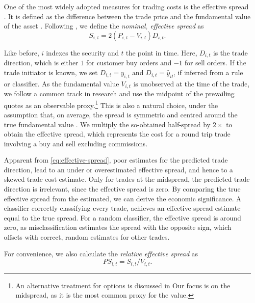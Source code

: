 One of the most widely adopted measures for trading costs is the effective spread \autocite[][112]{Piwowar_2006}. It is defined as the difference between the trade price and the fundamental value of the asset \autocite[][238--239]{bessembinderIssuesAssessingTrade2003}. Following \textcite[][238--239]{bessembinderIssuesAssessingTrade2003}, we define the \emph{nominal, effective spread} as
\begin{equation}
    S_{i,t} = 2 (P_{i,t} - V_{i,t}) D_{i,t}.
    \label{eq:effective-spread}
\end{equation}

Like before, $i$ indexes the security and $t$ the point in time. Here, $D_{i,t}$ is the trade direction, which is either $1$ for customer buy orders and $-1$ for sell orders. If the trade initiator is known, we set $D_{i,t} = y_{i,t}$ and $D_{i,t}=\hat{y}_{it}$, if inferred from a rule or classifier. As the fundamental value $V_{i,t}$ is unobserved at the time of the trade, we follow a common track in research and use the midpoint of the prevailing quotes as an observable proxy.\footnote{An alternative treatment for options is discussed in \textcite[][4975--4976]{muravyevOptionsTradingCosts2020} Our focus is on the midspread, as it is the most common proxy for the value.} This is also a natural choice, under the assumption that, on average, the spread is symmetric and centred around the true fundamental value \autocite[][1018]{leeMarketIntegrationPrice1993}. We multiply the so-obtained half-spread by $2 \times$ to obtain the effective spread, which represents the cost for a round trip trade involving a buy and sell excluding commissions.

Apparent from \cref{eq:effective-spread}, poor estimates for the predicted trade direction, lead to an under or overestimated effective spread, and hence to a skewed trade cost estimate. Only for trades at the midspread, the predicted trade direction is irrelevant, since the effective spread is zero. By comparing the true effective spread from the estimated, we can derive the economic significance. A classifier correctly classifying every trade, achieves an effective spread estimate equal to the true spread. For a random classifier, the effective spread is around zero, as misclassification estimates the spread with the opposite sign, which offsets with correct, random estimates for other trades.

For convenience, we also calculate the \emph{relative effective spread} as
\begin{equation}
    {PS}_{i,t} = S_{i,t} / V_{i,t}.
\end{equation}

